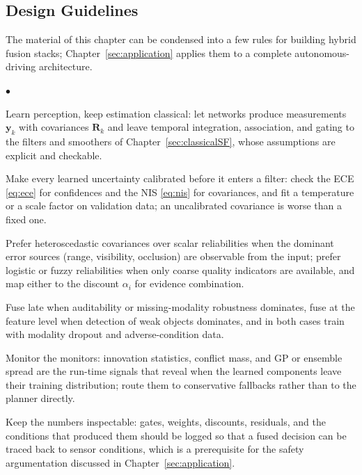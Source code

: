\documentclass[graybox,envcountchap]{style/SNmono}
\newenvironment{list4a}{
  \begin{list}{$\bullet$}{
      \setlength{\itemsep}{0.05cm}
      \setlength{\labelsep}{0.2cm}
      \setlength{\labelwidth}{0.3cm}
      \setlength{\parsep}{0in}
      \setlength{\parskip}{0in}
      \setlength{\topsep}{0in}
      \setlength{\partopsep}{0in}
      \setlength{\leftmargin}{0.16in}}}
      {\end{list}}
\begin{document}
\subsection{Design Guidelines}
\label{subsec:hybrid-guidelines}
The material of this chapter can be condensed into a few rules for building hybrid fusion stacks; Chapter~\ref{sec:application} applies them to a complete autonomous-driving architecture.
\begin{list4a}
    \item Learn perception, keep estimation classical: let networks produce measurements $\mathbf{y}_k$ with covariances $\mathbf{R}_k$ and leave temporal integration, association, and gating to the filters and smoothers of Chapter~\ref{sec:classicalSF}, whose assumptions are explicit and checkable.
    \item Make every learned uncertainty calibrated before it enters a filter: check the ECE \eqref{eq:ece} for confidences and the NIS \eqref{eq:nis} for covariances, and fit a temperature or a scale factor on validation data; an uncalibrated covariance is worse than a fixed one.
    \item Prefer heteroscedastic covariances over scalar reliabilities when the dominant error sources (range, visibility, occlusion) are observable from the input; prefer logistic or fuzzy reliabilities when only coarse quality indicators are available, and map either to the discount $\alpha_i$ for evidence combination.
    \item Fuse late when auditability or missing-modality robustness dominates, fuse at the feature level when detection of weak objects dominates, and in both cases train with modality dropout and adverse-condition data.
    \item Monitor the monitors: innovation statistics, conflict mass, and GP or ensemble spread are the run-time signals that reveal when the learned components leave their training distribution; route them to conservative fallbacks rather than to the planner directly.
    \item Keep the numbers inspectable: gates, weights, discounts, residuals, and the conditions that produced them should be logged so that a fused decision can be traced back to sensor conditions, which is a prerequisite for the safety argumentation discussed in Chapter~\ref{sec:application}.
\end{list4a}
\end{document}
